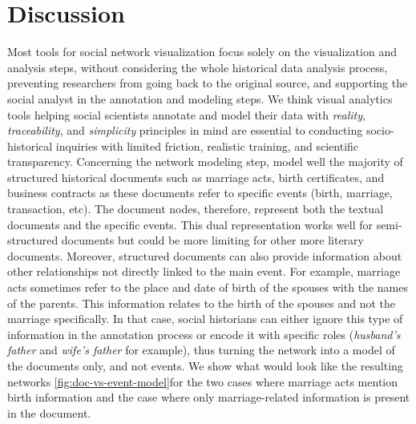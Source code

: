 \section{Discussion}


Most tools for social network visualization focus solely on the visualization and analysis steps, without considering the whole historical data analysis process, preventing researchers from going back to the original source, and supporting the social analyst in the annotation and modeling steps.
We think visual analytics tools helping social scientists annotate and model their data with \textit{reality}, \textit{traceability}, and \textit{simplicity} principles in mind are essential to conducting socio-historical inquiries with limited friction, realistic training, and scientific transparency.
Concerning the network modeling step, \modelplural model well the majority of structured historical documents such as marriage acts, birth certificates, and business contracts as these documents refer to specific events (birth, marriage, transaction, etc).
The document nodes, therefore, represent both the textual documents and the specific events.
This dual representation works well for semi-structured documents but could be more limiting for other more literary documents.
Moreover, structured documents can also provide information about other relationships not directly linked to the main event.
For example, marriage acts sometimes refer to the place and date of birth of the spouses with the names of the parents.
This information relates to the birth of the spouses and not the marriage specifically.
In that case, social historians can either ignore this type of information in the annotation process or encode it with specific roles (\textit{husband's father} and \textit{wife's father} for example), thus turning the network into a model of the documents only, and not events.
We show what would look like the resulting networks \autoref{fig:doc-vs-event-model}for the two cases where marriage acts mention birth information and the case where only marriage-related information is present in the document.

